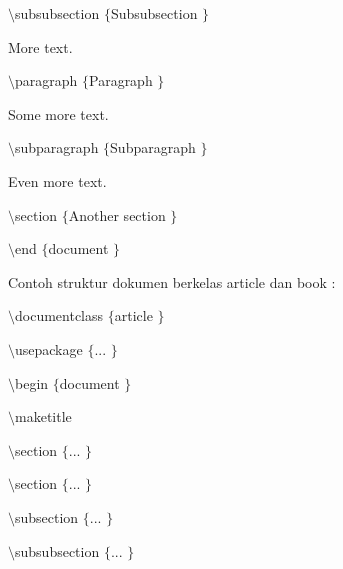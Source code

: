\vspace{12pt}
 $  \setminus  $subsubsection $  \{  $Subsubsection $  \}  $
 \par
\vspace{12pt}
More text.
 \par
\vspace{12pt}
 $  \setminus  $paragraph $  \{  $Paragraph $  \}  $
 \par
\vspace{12pt}
Some more text.
 \par
\vspace{12pt}
 $  \setminus  $subparagraph $  \{  $Subparagraph $  \}  $
 \par
\vspace{12pt}
Even more text.
 \par
\vspace{12pt}
 $  \setminus  $section $  \{  $Another section $  \}  $
 \par
\vspace{12pt}
 $  \setminus  $end $  \{  $document $  \}  $
 \par
\vspace{12pt}
\vspace{12pt}
Contoh struktur dokumen berkelas article dan book :
 \par
{\fontsize{10pt}{10pt}\selectfont  $  \setminus  $documentclass $  \{  $article $  \}  $}
 \par
\vspace{10pt}
{\fontsize{10pt}{10pt}\selectfont  $  \setminus  $usepackage $  \{  $... $  \}  $}
 \par
\vspace{10pt}
{\fontsize{10pt}{10pt}\selectfont  $  \setminus  $begin $  \{  $document $  \}  $}
 \par
\vspace{10pt}
{\fontsize{10pt}{10pt}\selectfont  $  \setminus  $maketitle}
 \par
\vspace{10pt}
{\fontsize{10pt}{10pt}\selectfont  $  \setminus  $section $  \{  $... $  \}  $}
 \par
\vspace{10pt}
{\fontsize{10pt}{10pt}\selectfont  $  \setminus  $section $  \{  $... $  \}  $}
 \par
\vspace{10pt}
{\fontsize{10pt}{10pt}\selectfont  $  \setminus  $subsection $  \{  $... $  \}  $}
 \par
\vspace{10pt}
{\fontsize{10pt}{10pt}\selectfont  $  \setminus  $subsubsection $  \{  $... $  \}  $}
